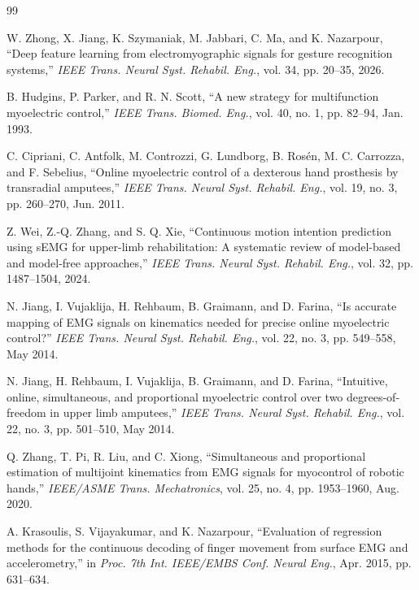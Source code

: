 \documentclass[journal]{IEEEtran}
\begin{document}
\begin{thebibliography}{99}

W. Zhong, X. Jiang, K. Szymaniak, M. Jabbari, C. Ma, and K. Nazarpour,
``Deep feature learning from electromyographic signals for gesture recognition systems,''
\emph{IEEE Trans. Neural Syst. Rehabil. Eng.}, vol. 34, pp. 20--35, 2026.

B. Hudgins, P. Parker, and R. N. Scott,
``A new strategy for multifunction myoelectric control,''
\emph{IEEE Trans. Biomed. Eng.}, vol. 40, no. 1, pp. 82--94, Jan. 1993.

C. Cipriani, C. Antfolk, M. Controzzi, G. Lundborg, B. Ros{\'e}n, M. C. Carrozza, and F. Sebelius,
``Online myoelectric control of a dexterous hand prosthesis by transradial amputees,''
\emph{IEEE Trans. Neural Syst. Rehabil. Eng.}, vol. 19, no. 3, pp. 260--270, Jun. 2011.

Z. Wei, Z.-Q. Zhang, and S. Q. Xie,
``Continuous motion intention prediction using sEMG for upper-limb rehabilitation: A systematic review of model-based and model-free approaches,''
\emph{IEEE Trans. Neural Syst. Rehabil. Eng.}, vol. 32, pp. 1487--1504, 2024.

N. Jiang, I. Vujaklija, H. Rehbaum, B. Graimann, and D. Farina,
``Is accurate mapping of EMG signals on kinematics needed for precise online myoelectric control?''
\emph{IEEE Trans. Neural Syst. Rehabil. Eng.}, vol. 22, no. 3, pp. 549--558, May 2014.

N. Jiang, H. Rehbaum, I. Vujaklija, B. Graimann, and D. Farina,
``Intuitive, online, simultaneous, and proportional myoelectric control over two degrees-of-freedom in upper limb amputees,''
\emph{IEEE Trans. Neural Syst. Rehabil. Eng.}, vol. 22, no. 3, pp. 501--510, May 2014.

Q. Zhang, T. Pi, R. Liu, and C. Xiong,
``Simultaneous and proportional estimation of multijoint kinematics from EMG signals for myocontrol of robotic hands,''
\emph{IEEE/ASME Trans. Mechatronics}, vol. 25, no. 4, pp. 1953--1960, Aug. 2020.

A. Krasoulis, S. Vijayakumar, and K. Nazarpour,
``Evaluation of regression methods for the continuous decoding of finger movement from surface EMG and accelerometry,''
in \emph{Proc. 7th Int. IEEE/EMBS Conf. Neural Eng.}, Apr. 2015, pp. 631--634.


\end{thebibliography}
\end{document}
